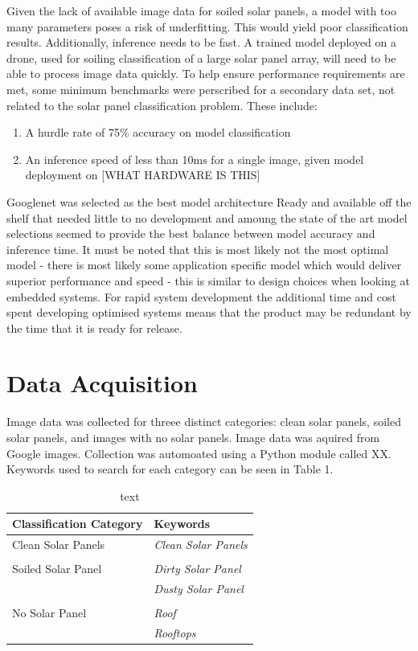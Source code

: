 \documentclass[10pt,journal,compsoc]{IEEEtran}
\begin{document}
		Given the lack of available image data for soiled solar panels, a model with too many parameters poses a risk of underfitting. This would yield poor classification results. Additionally, inference needs to be fast. A trained model deployed on a drone, used for soiling classification of a large solar panel array, will need to be able to process image data quickly. To help ensure performance requirements are met, some minimum benchmarks were perscribed for a secondary data set, not related to the solar panel classification problem. These include:
		\begin{enumerate}
			\item A hurdle rate of 75\% accuracy on model classification
			\item An inference speed of less than 10$\si{\milli\second}$ for a single image, given model deployment on [WHAT HARDWARE IS THIS]
		\end{enumerate}
		
		Googlenet was selected as the best model architecture Ready and available off the shelf that needed little to no development and amoung the state of the art model selections seemed to provide the best balance between model accuracy and inference time. It must be noted that this is most likely not the most optimal model - there is most likely some application specific model which would deliver superior performance and speed - this is similar to design choices when looking at embedded systems. For rapid system development the additional time and cost spent developing optimised systems means that the product may be redundant by the time that it is ready for release.
			
		\section{Data Acquisition}
		Image data was collected for threee distinct categories: clean solar panels, soiled solar panels, and images with no solar panels. Image data was aquired from Google images. Collection was automoated using a Python module called XX. Keywords used to search for each category can be seen in Table 1.
		\begin{table}[h]
			\centering
			\caption{text}
			\begin{tabular}{ll}
				\toprule
				\textbf{Classification Category} & \textbf{Keywords} \\
				\midrule
				Clean Solar Panels & \textit{Clean Solar Panels}\\
				 & \\
				Soiled Solar Panel & \textit{Dirty Solar Panel} \\
				 & \textit{Dusty Solar Panel} \\
				  & \\
				No Solar Panel & \textit{Roof} \\
				 & \textit{Rooftops} \\
				\bottomrule
			\end{tabular}
		\end{table}
		
\end{document}
